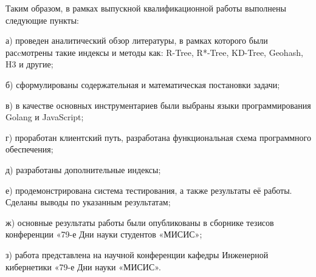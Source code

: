 \Conclusion

Таким образом, в рамках выпускной квалификационной работы выполнены следующие пункты:
\par а) проведен аналитический обзор литературы, в рамках которого были расcмотрены такие индексы и методы как: R-Tree, R*-Tree, KD-Tree, Geohash, H3 и другие;
\par б) сформулированы содержательная и математическая постановки задачи;
\par в) в качестве основных инструментариев были выбраны языки программирования Golang и JavaScript;
\par г) проработан клиентский путь, разработана функциональная схема программного обеспечения;
\par д) разработаны дополнительные индексы;
\par е) продемонстрирована система тестирования, а также результаты её работы. Сделаны выводы по указанным результатам;
\par ж) основные результаты работы были опубликованы в сборнике тезисов конференции «79-е Дни науки студентов «МИСИС»\cite{ibragimov};
\par з) работа представлена на научной конференции кафедры Инженерной кибернетики «79-е Дни науки «МИСИС»\cite{ibragimov}.
